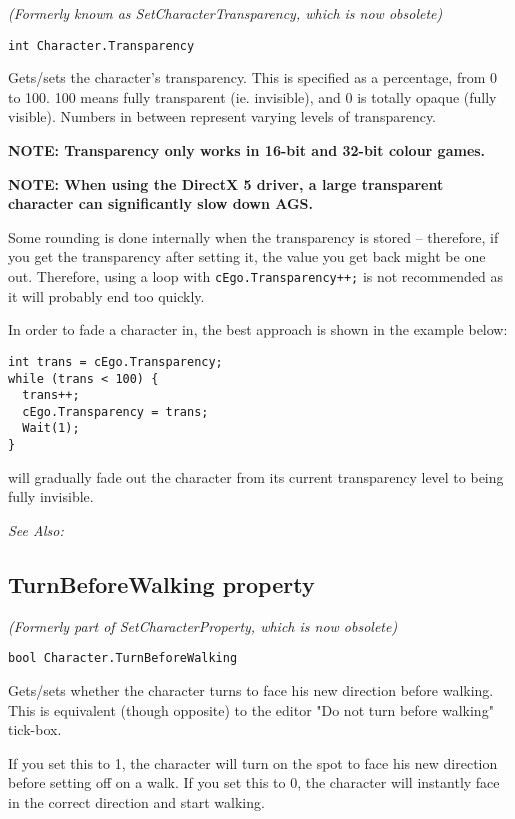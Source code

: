 \it{(Formerly known as SetCharacterTransparency, which is now obsolete)}

\begin{verbatim}
int Character.Transparency
\end{verbatim}
Gets/sets the character's transparency. This is specified as a percentage, from 0 to 100.
100 means fully transparent (ie. invisible), and 0 is totally opaque (fully visible). Numbers
in between represent varying levels of transparency.

\bf{NOTE:} Transparency only works in 16-bit and 32-bit colour games.

\bf{NOTE:} When using the DirectX 5 driver, a large transparent character can significantly slow
down AGS.

Some rounding is done internally when the transparency is stored -- therefore, if you get
the transparency after setting it, the value you get back might be one out. Therefore, using
a loop with \verb$cEgo.Transparency++;$ is not recommended as it will probably
end too quickly.

In order to fade a character in, the best approach is shown in the example below:

\begin{verbatim}
int trans = cEgo.Transparency;
while (trans < 100) {
  trans++;
  cEgo.Transparency = trans;
  Wait(1);
}
\end{verbatim}
will gradually fade out the character from its current transparency level to being fully
invisible.

\it{See Also:} 


\subsection{TurnBeforeWalking property}\label{Character.TurnBeforeWalking}%

\it{(Formerly part of SetCharacterProperty, which is now obsolete)}

\begin{verbatim}
bool Character.TurnBeforeWalking
\end{verbatim}
Gets/sets whether the character turns to face his new direction before walking. This
is equivalent (though opposite) to the editor "Do not turn before walking" tick-box.

If you set this to 1, the character will turn on the spot to face his new direction
before setting off on a walk. If you set this to 0, the character will instantly face
in the correct direction and start walking.


